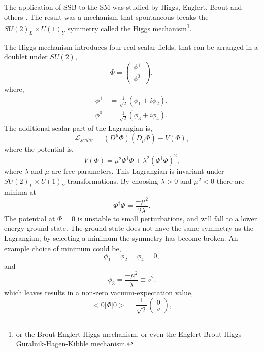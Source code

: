The application of {SSB} to the {SM} was studied by Higgs, Englert, Brout
and others \cite{higgs1981broken, englert1964broken, guralnik1964global}.
The result was a mechanism that spontaneous breaks the
 $SU(2)_{L} \times U(1)_{Y}$ symmetry called the Higgs mechanism\footnote{or the
Brout-Englert-Higgs mechanism, or even the
Englert-Brout-Higgs-Guralnik-Hagen-Kibble mechanism.}.

The Higgs mechanism introduces four real scalar fields, that can be arranged in a
doublet under $SU(2)$,
\begin{equation}
\Phi = \left( \begin{matrix} \phi^{+} \\ \phi^{0} \end{matrix} \right),
\end{equation}
where,
\begin{align*}
\phi^{+} &=\frac{1}{\sqrt{2}} (\phi_{1} + i \phi_{2}),\\
\phi^{0} &=\frac{1}{\sqrt{2}} (\phi_{3} + i \phi_{4}).
\end{align*}
The additional scalar part of the Lagrangian is,
\begin{equation}
\mathcal{L}_{scalar} = 
\left(D^{\mu}\Phi\right) \left(D_{\mu}\Phi\right) - V(\Phi),
\end{equation}
where the potential is,
\begin{equation}
V(\Phi) = 
\mu^{2}\Phi^{\dagger}\Phi + 
\lambda^{2} \left( \Phi^{\dagger} \Phi \right)^{2},
\end{equation}
where $\lambda$ and $\mu$ are free parameters. This Lagrangian is invariant
under $SU(2)_{L} \times U(1)_{Y}$ transformations.
By choosing  $\lambda>0$ and
$\mu^{2}<0$ there are minima at
\begin{equation}
\Phi^{\dagger} \Phi = \frac{- \mu^{2}}{2 \lambda}.
\end{equation}
The potential at $\Phi=0$ is unstable to small perturbations, and will fall
to a lower energy ground state. 
The ground state does not have the same symmetry as the Lagrangian; by
selecting a minimum the symmetry has become broken. An example choice of minimum
could be,
\begin{equation}
\phi_{1} = \phi_{2} = \phi_{4} = 0,
\end{equation}
and
\begin{equation}
\phi_{3} = \frac{-\mu^{2}}{\lambda} \equiv v^{2}.
\end{equation}
which leaves results in a non-zero vacuum-expectation value,
\begin{equation}
<0|\Phi|0> = \frac{1}{\sqrt{2}}\left(\begin{matrix}0\\v\end{matrix}\right),
\end{equation}
